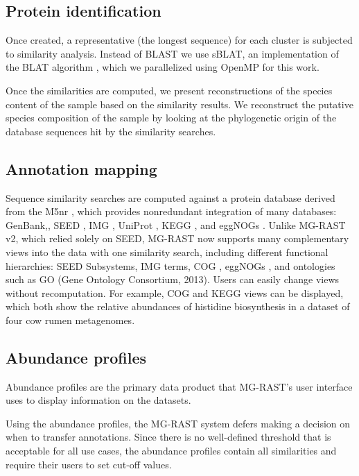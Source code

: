 \documentclass[12pt,fullpage]{report}
\begin{document}
\subsection{Protein identification}
Once created, a representative (the longest sequence) for each cluster is subjected to similarity analysis. Instead of BLAST we use sBLAT, an implementation of the BLAT algorithm \cite{BLAT}, which we parallelized using OpenMP \cite{OPENMP} for this work.

Once the similarities are computed, we present reconstructions of the species content of the sample based on the similarity results. We reconstruct the putative species composition of the sample by looking at the phylogenetic origin of the database sequences hit by the similarity searches.
\subsection{Annotation mapping}
 Sequence similarity searches are computed against a protein database derived from the M5nr \cite{M5NR}, which provides nonredundant integration of many databases: GenBank,\cite{GENBANK}, \gls{SEED} \cite{SUBSYSTEMS}, IMG \cite{IMG}, UniProt \cite{UNIPROT}, KEGG \cite{KEGG}, and eggNOGs \cite{EGGNOG}. Unlike MG-RAST v2, which relied solely on SEED, MG-RAST now supports many complementary views into the data with one similarity search, including different functional hierarchies: SEED \gls{Subsystem}s, IMG terms, COG \cite{COG}, eggNOGs \cite{EGGNOG}, and ontologies such as GO (Gene Ontology Consortium, 2013). Users can easily change views without recomputation. For example, COG and KEGG views can be displayed, which both show the relative abundances of histidine biosynthesis in a dataset of four cow rumen metagenomes.
\subsection{Abundance profiles}

Abundance profiles are the primary data product that MG-RAST's user interface uses to display information on the datasets.

Using the abundance profiles, the MG-RAST system defers making a decision on when to transfer annotations. Since there is no well-defined threshold that is acceptable for all use cases, the abundance profiles contain all similarities and require their users to set cut-off values.
\end{document}
